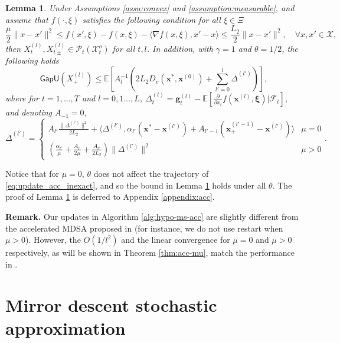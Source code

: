 \documentclass[11pt,fullpage,letterpaper]{article}
\newcommand{\mc}{\mathcal}
\newcommand{\mb}{\mathbf}
\newcommand{\E}{\mathbb{E}}
\newcommand{\bx}{\boldsymbol{\xi}}
\newcommand{\gapu}{\mathsf{GapU}}
\newtheorem{lemma}{Lemma}[section]
\begin{document}
\begin{lemma}\label{lm:acc-inexact-multi-stage}
Under Assumptions \ref{assu:convex} and \ref{assumption:measurable}, and assume that $f(\cdot,\xi)$ satisfies the following condition for all $\xi\in \Xi$
\begin{equation}\label{eq:condition-convex-smooth-f}
    \frac{\mu}{2}\|x - x'\|^2\leq f(x',\xi) - f(x,\xi) - \langle \nabla f(x,\xi),x'-x\rangle \leq \frac{L_2}{2}\|x - x'\|^2,\quad \forall x,x'\in  \mc X,
\end{equation}
 then $X_t^{(l)}, X_{t\pm}^{(l)}\in \mc P_t(\mc X_t^o)$ for all $t,l$. In addition, with $\gamma = 1$ and $\theta = 1/2$, the following holds
\begin{displaymath}
\gapu(X_{+}^{(l)}) \leq \E[A_l^{-1}(2L_2D_v(\mb x^*,\mb x^{(0)}) + \sum_{l'=0}^{l}\overline{\Delta}^{(l')})],
\end{displaymath}
where for $t = 1,\ldots,T$ and $l = 0,1\ldots,L$, $\Delta^{(l)}_t = \mb g_t^{(l)} - \E[\frac{\partial}{\partial x_t} f(\mb x^{(l)},\bx)|\mc F_t]$, and denoting $A_{-1} = 0$,
\begin{displaymath}
    \overline{\Delta}^{(l')} =\begin{cases}A_{l'}\frac{\|\Delta^{(l')}\|^2}{2 L_2} +  \langle \Delta^{(l')},\alpha_{l'}(\mb x^*-\mb x^{(l')}) + A_{l'-1}(\mb x_+^{(l'-1)}-\mb x^{(l')})\rangle&\mu=0\\
(\frac{\alpha_{l'}}{\mu} + \frac{A_{l'}}{2\mu}+\frac{A_{l'}}{2L_2})\|\Delta^{(l')}\|^2 &\mu >0
\end{cases}.
\end{displaymath}

\end{lemma}
Notice that for $\mu = 0$, $\theta$ does not affect the trajectory of \eqref{eq:update_acc_inexact}, and so the bound in Lemma \ref{lm:acc-inexact-multi-stage} holds under all $\theta$. The proof of Lemma \ref{lm:acc-inexact-multi-stage} is deferred to Appendix \ref{appendix:acc}.

\textbf{Remark.} Our updates in Algorithm \ref{alg:hypo-ms-acc} are slightly different from the accelerated MDSA proposed in \cite{lan_optimal_2012} (for instance, we do not use restart when $\mu> 0$). However, the $O(1/l^2)$ and the linear convergence for $\mu= 0$ and $\mu>0$ respectively, as will be shown in Theorem \ref{thm:acc-mu}, match the performance in \cite{lan_optimal_2012}. 


\section{Mirror descent stochastic approximation}\label{sec:SA}
\end{document}
